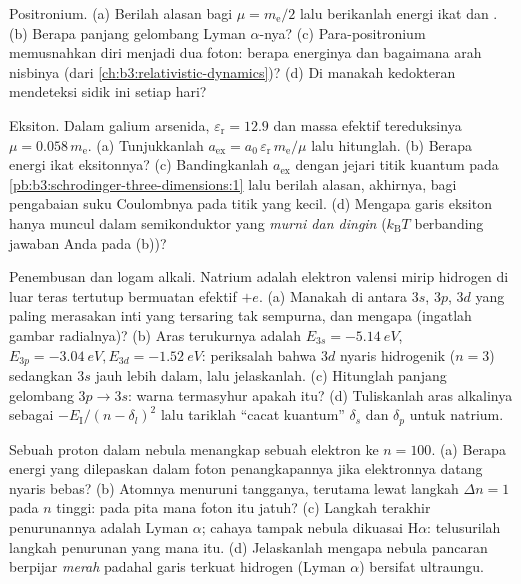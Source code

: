 \begin{exercise}[$\star\star$]\label{exo:b3:hydrogen-atom:6}
Positronium. (a) Berilah alasan bagi $\mu = m_{\text{e}}/2$ lalu
berikanlah energi ikat dan . (b) Berapa panjang gelombang
Lyman $\alpha$-nya? (c) Para-positronium memusnahkan diri menjadi dua
foton: berapa energinya dan bagaimana arah nisbinya (dari
\cref{ch:b3:relativistic-dynamics})? (d) Di manakah kedokteran
mendeteksi sidik ini setiap hari?
\end{exercise}

\begin{exercise}[$\star\star$]\label{exo:b3:hydrogen-atom:7}
Eksiton. Dalam galium arsenida, $\varepsilon_{\text{r}} = 12.9$ dan
massa efektif tereduksinya $\mu = 0.058\,m_{\text{e}}$. (a) Tunjukkanlah
$a_{\text{ex}} = a_0\,\varepsilon_{\text{r}}\,m_{\text{e}}/\mu$ lalu
hitunglah. (b) Berapa energi ikat eksitonnya? (c) Bandingkanlah
$a_{\text{ex}}$ dengan jejari titik kuantum pada
\cref{pb:b3:schrodinger-three-dimensions:1} lalu berilah alasan,
akhirnya, bagi pengabaian suku Coulombnya pada titik yang kecil. (d)
Mengapa garis eksiton hanya muncul dalam semikonduktor yang \emph{murni
dan dingin} ($k_{\text{B}}T$ berbanding jawaban Anda pada (b))?
\end{exercise}

\begin{exercise}[$\star\star$]\label{exo:b3:hydrogen-atom:8}
Penembusan dan logam alkali. Natrium adalah elektron valensi mirip
hidrogen di luar teras tertutup bermuatan efektif $+e$.
(a) Manakah di antara $3s$, $3p$, $3d$ yang paling merasakan inti yang
tersaring tak sempurna, dan mengapa (ingatlah gambar radialnya)? (b)
Aras terukurnya adalah $E_{3s} = \qty{-5.14}{eV}$, $E_{3p} = \qty{-3.04}{eV},
E_{3d} = \qty{-1.52}{eV}$: periksalah bahwa $3d$ nyaris hidrogenik
($n = 3$) sedangkan $3s$ jauh lebih dalam, lalu jelaskanlah. (c)
Hitunglah panjang gelombang $3p \to 3s$: warna termasyhur apakah itu?
(d) Tuliskanlah aras alkalinya sebagai $-E_{\text{I}}/(n - \delta_l)^2$
lalu tariklah ``cacat kuantum'' $\delta_s$ dan $\delta_p$ untuk natrium.
\end{exercise}

\begin{exercise}[$\star\star$]\label{exo:b3:hydrogen-atom:9}
Sebuah proton dalam nebula menangkap sebuah elektron ke $n = 100$. (a)
Berapa energi yang dilepaskan dalam foton penangkapannya jika
elektronnya datang nyaris bebas? (b) Atomnya menuruni tangganya,
terutama lewat langkah $\Delta n = 1$ pada $n$ tinggi: pada pita mana
foton itu jatuh? (c) Langkah terakhir penurunannya adalah Lyman
$\alpha$; cahaya tampak nebula dikuasai H$\alpha$: telusurilah langkah
penurunan yang mana itu. (d) Jelaskanlah mengapa nebula pancaran
berpijar \emph{merah} padahal garis terkuat hidrogen (Lyman $\alpha$)
bersifat ultraungu.
\end{exercise}

